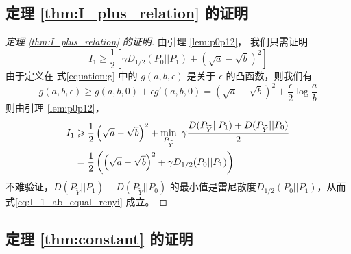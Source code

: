 \subsection{定理 \ref{thm:I_plus_relation} 的证明}

\begin{proof}[定理 \ref{thm:I_plus_relation} 的证明]
    由引理 \ref{lem:p0p12}，
    我们只需证明
    $$
    I_1 \geq 
    \frac{1}{2}\left[
        \gamma D_{1/2}(P_0||P_1)
    + \left(\sqrt{a} - \sqrt{b}\right)^2
    \right]
    $$
    由于定义在 式\eqref{equation:g} 中的 $g(a,b,\epsilon)$ 是关于 $\epsilon$
    的凸函数，则我们有
    \begin{equation}\label{eq:g_linear}
            g(a,b,\epsilon) \geq g(a,b,0) + \epsilon g'(a,b,0) = \left(\sqrt{a} - \sqrt{b}\right)^2 + \frac{\epsilon}{2}\log \frac{a}{b}
        \end{equation}
        则由引理 \ref{lem:p0p12}，
        \begin{align}
            I_1 &\geq \frac{1}{2}\left(\sqrt{a} - \sqrt{b}\right)^2+\min_{P_{\widetilde{Y}}}\ 
            \gamma
            \frac{D(P_{\widetilde{Y}} || P_1) + D(P_{\widetilde{Y}} || P_0)}{2} \notag\\
            &= \frac{1}{2}\left(\left(\sqrt{a} - \sqrt{b}\right)^2+\gamma D_{1/2}(P_0||P_1)
            \right)
            \label{eq:I_1_ab_equal_renyi}
        \end{align}
        不难验证，$D(P_{\widetilde{Y}} || P_1) + D(P_{\widetilde{Y}} || P_0)$
        的最小值是雷尼散度$D_{1/2}(P_0||P_1)$，从而
        式\eqref{eq:I_1_ab_equal_renyi} 成立。
\end{proof}

\subsection{定理 \ref{thm:constant} 的证明}

